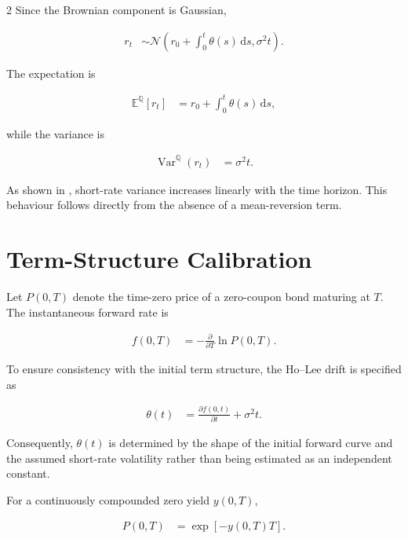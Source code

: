\documentclass[10pt,a4paper]{article}
\newcommand{\E}{\mathbb{E}}
\newcommand{\Q}{\mathbb{Q}}
\newcommand{\Var}{\operatorname{Var}}
\newcommand{\dd}{\,\mathrm{d}}
\numberwithin{equation}{section}
\begin{document}
\begin{multicols}{2}
Since the Brownian component is Gaussian,

\begin{align*}
    r_t
    &\sim
    \mathcal{N}
    \left(
        r_0+\int_0^t\theta(s)\dd s,
        \sigma^2t
    \right).
\end{align*}

The expectation is

\begin{align*}
    \E^{\Q}[r_t]
    &=
    r_0+\int_0^t\theta(s)\dd s,
\end{align*}

while the variance is

\begin{align}
    \Var^{\Q}(r_t)
    &=
    \sigma^2t.
    \label{eq:ho_lee_variance}
\end{align}

As shown in , short-rate variance increases
linearly with the time horizon. This behaviour follows directly from the
absence of a mean-reversion term.

\section{Term-Structure Calibration}

Let $P(0,T)$ denote the time-zero price of a zero-coupon bond maturing at
$T$. The instantaneous forward rate is

\begin{align*}
    f(0,T)
    &=
    -\frac{\partial}{\partial T}
    \ln P(0,T).
\end{align*}

To ensure consistency with the initial term structure, the Ho--Lee drift
is specified as

\begin{align}
    \theta(t)
    &=
    \frac{\partial f(0,t)}{\partial t}
    +
    \sigma^2t.
    \label{eq:ho_lee_theta}
\end{align}

Consequently, $\theta(t)$ is determined by the shape of the initial
forward curve and the assumed short-rate volatility rather than being
estimated as an independent constant.

For a continuously compounded zero yield $y(0,T)$,

\begin{align*}
    P(0,T)
    &=
    \exp[-y(0,T)T].
\end{align*}


\end{multicols}
\end{document}
